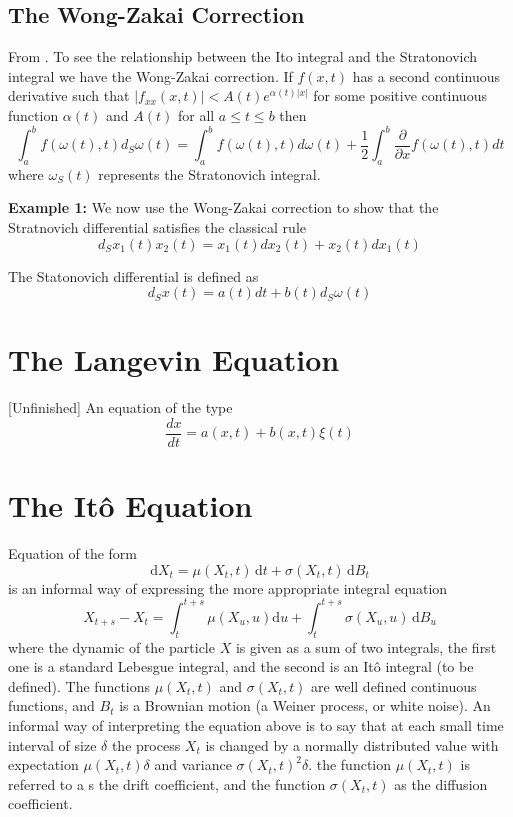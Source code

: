 \documentclass[12pt]{report}
\begin{document}
\subsection{The Wong-Zakai Correction}
From \cite{schuss2009theory}. To see the relationship between the Ito integral and the Stratonovich integral we have the Wong-Zakai correction.  If $f(x,t)$ has a second continuous derivative such that $|f_{xx}(x,t)|<A(t)e^{\alpha(t)|x|} $ for some positive continuous function $\alpha(t)$ and $A(t)$ for all $a\leq t \leq b$ then
\begin{equation}
\int_{a}^b f(\omega(t),t)d_S\omega(t) = \int_a^b f(\omega(t),t)d\omega(t)+\frac{1}{2}\int_a^b\frac{\partial}{\partial x}f(\omega(t),t)dt
\end{equation}
where $\omega_S(t)$ represents the Stratonovich integral.

\textbf{Example 1:} We now use the Wong-Zakai correction to show that the Stratnovich differential satisfies the classical rule
\begin{equation*}
d_Sx_1(t)x_2(t)= x_1(t)dx_2(t) +x_2(t)dx_1(t)
\end{equation*}

The Statonovich differential is defined as 
\begin{equation*}
d_Sx(t) = a(t)dt+b(t)d_S\omega(t)
\end{equation*}



\section{The Langevin Equation}{[Unfinished]}
An equation of the type 
\begin{equation*}
\frac{dx}{dt}=a(x,t)+b(x,t)\xi(t)
\end{equation*}

\section{The It\^{o} Equation}
Equation of the form 
\begin{equation*}
 \mathrm{d} X_t = \mu(X_t,t)\, \mathrm{d} t +  \sigma(X_t,t)\, \mathrm{d} B_t
\end{equation*}
is an informal way of expressing the more appropriate integral equation 
\begin{equation*}
X_{t+s} - X_{t} = \int_t^{t+s} \mu(X_u,u) \mathrm{d} u + \int_t^{t+s} \sigma(X_u,u)\, \mathrm{d} B_u
\end{equation*}
where the dynamic of the particle $X$ is given as a sum of two integrals, the first one is a standard Lebesgue integral, and the second is an It\^{o} integral (to be defined).  
The functions $\mu(X_t,t)$ and $\sigma(X_t,t)$ are well defined continuous functions, and $B_t$ is a Brownian motion (a Weiner process, or white noise). An informal way of interpreting the equation above is to say that at each small time interval of size $\delta$ the process $X_t$ is changed by a normally distributed value with expectation $\mu(X_t,t)\delta$ and variance $\sigma(X_t,t)^2\delta$. 
the function $\mu(X_t,t)$ is referred to a s the drift coefficient, and the function $\sigma(X_t,t)$ as the diffusion coefficient. 
\end{document}
